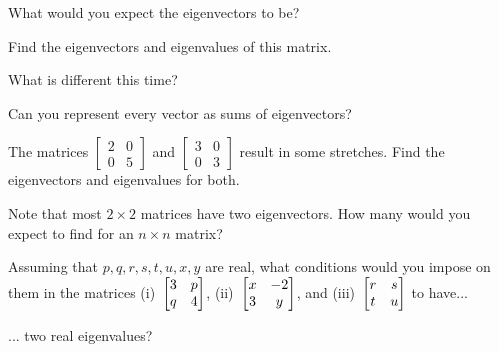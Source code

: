 \documentclass[../gatm_answers.tex]{subfiles}
\begin{document}
\begin{inner_problem}
\item What would you expect the eigenvectors to be?
\end{inner_problem}

\begin{inner_problem}
\item Find the eigenvectors and eigenvalues of this matrix.
\end{inner_problem}

\begin{inner_problem}
\item What is different this time?
\end{inner_problem}

\begin{inner_problem}
\item Can you represent every vector as sums of eigenvectors?
\end{inner_problem}

\begin{outer_problem}
\item The matrices $\left[\begin{smallmatrix} 2 & 0 \\ 0 & 5 \end{smallmatrix}\right]$ and $\left[\begin{smallmatrix} 3 & 0 \\ 0 & 3 \end{smallmatrix}\right]$ result in some stretches. Find the eigenvectors and eigenvalues for both.
\end{outer_problem}

\begin{outer_problem}
\item Note that most $2\times 2$ matrices have two eigenvectors. How many would you expect to find for an $n\times n$ matrix?
\end{outer_problem}

\begin{outer_problem}
\item Assuming that $p,q,r,s,t,u,x,y$ are real, what conditions would you impose on them in the matrices (i)~$\begin{bmatrix} 3 & p \\ q & 4 \end{bmatrix}$, (ii)~$\begin{bmatrix} x & -2 \\ 3 & y \end{bmatrix}$, and (iii)~$\begin{bmatrix} r & s \\ t & u \end{bmatrix}$ to have...
\end{outer_problem}

\begin{inner_problem}[start=1]
\item ... two real eigenvalues?
\end{inner_problem}
\end{document}
